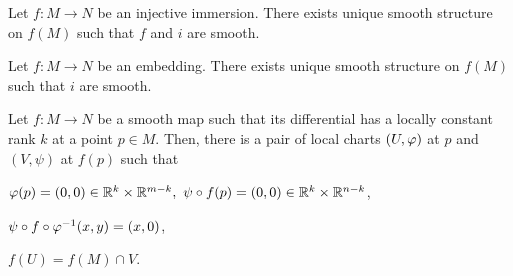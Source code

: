 \documentclass{../note}
\begin{document}
Let $f:M\to N$ be an injective immersion.
There exists unique smooth structure on $f(M)$ such that $f$ and $i$ are smooth.

Let $f:M\to N$ be an embedding.
There exists unique smooth structure on $f(M)$ such that $i$ are smooth.


\begin{prb}
Let $f:M\to N$ be a smooth map such that its differential has a locally constant rank $k$ at a point $p\in M$.
Then, there is a pair of local charts $(U,\varphi)$ at $p$ and $(V,\psi)$ at $f(p)$ such that
\begin{parts}
\item $\f(p)=(0,0)\in\R^k\times\R^{m-k},\ \psi\circ f(p)=(0,0)\in\R^k\times\R^{n-k}$,
\item $\psi\circ f\circ\varphi^{-1}(x,y)=(x,0)$,
\item $f(U)=f(M)\cap V$.
\end{parts}
\end{prb}
\end{document}
